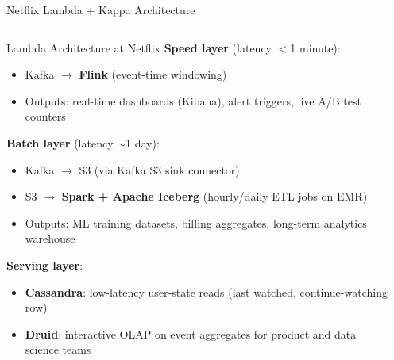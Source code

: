\documentclass[aspectratio=169,10pt]{beamer}
\begin{document}
\begin{frame}{Netflix Lambda + Kappa Architecture}
  \begin{columns}[T]
      \begin{block}{Lambda Architecture at Netflix}
        \textbf{Speed layer} (latency $<$1 minute):
        \begin{itemize}
          \item Kafka $\to$ \textbf{Flink} (event-time windowing)
          \item Outputs: real-time dashboards (Kibana),
                alert triggers, live A/B test counters
        \end{itemize}
        \vspace{4pt}
        \textbf{Batch layer} (latency $\sim$1 day):
        \begin{itemize}
          \item Kafka $\to$ S3 (via Kafka S3 sink connector)
          \item S3 $\to$ \textbf{Spark + Apache Iceberg}
                (hourly/daily ETL jobs on EMR)
          \item Outputs: ML training datasets, billing aggregates,
                long-term analytics warehouse
        \end{itemize}
        \vspace{4pt}
        \textbf{Serving layer}:
        \begin{itemize}
          \item \textbf{Cassandra}: low-latency user-state reads
                (last watched, continue-watching row)
          \item \textbf{Druid}: interactive OLAP on event aggregates
                for product and data science teams
        \end{itemize}
      \end{block}

      \begin{center}
\end{center}
\end{columns}
\end{frame}
\end{document}
